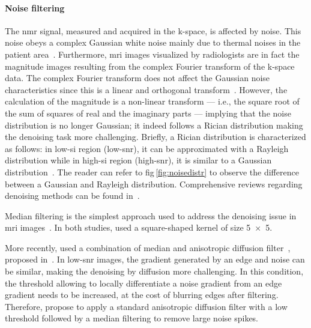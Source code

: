 \paragraph{Noise filtering} The \ac{nmr} signal, measured and acquired in the k-space, is affected by noise.
This noise obeys a complex Gaussian white noise mainly due to thermal noises in the patient area~\cite{Nowak1999}.
Furthermore, \ac{mri} images visualized by radiologists are in fact the magnitude images resulting from the complex Fourier transform of the k-space data.
The complex Fourier transform does not affect the Gaussian noise characteristics since this is a linear and orthogonal transform~\cite{Nowak1999}.
However, the calculation of the magnitude is a non-linear transform --- i.e., the square root of the sum of squares of real and the imaginary parts --- implying that the noise distribution is no longer Gaussian; it indeed follows a Rician distribution making the denoising task more challenging.
Briefly, a Rician distribution is characterized as follows: in low-\ac{si} region (low-\ac{snr}), it can be approximated with a Rayleigh distribution while in high-\ac{si} region (high-\ac{snr}), it is similar to a Gaussian distribution~\cite{Manjon2008}.
The reader can refer to \acs{fig}\,\ref{fig:noisedistr} to observe the difference between a Gaussian and Rayleigh distribution.
Comprehensive reviews regarding denoising methods can be found in~\cite{Buades2005,Mohan2014}.

Median filtering is the simplest approach used to address the denoising issue in \ac{mri} images~\cite{Ozer2009,Ozer2010}.
In both studies, \citeauthor{Ozer2010} used a square-shaped kernel of size \SI[product-units=repeat]{5x5}{\px}.%

More recently, \citeauthor{rampun2016quantitative} used a combination of median and anisotropic diffusion filter~\cite{rampun2015classifying,rampun2016computer,rampun2016computerb,rampun2016quantitative}, proposed in~\cite{ling2002smoothing}.
In low-\ac{snr} images, the gradient generated by an edge and noise can be similar, making the denoising by diffusion more challenging.
In this condition, the threshold allowing to locally differentiate a noise gradient from an edge gradient needs to be increased, at the cost of blurring edges after filtering.
Therefore, \citeauthor{ling2002smoothing} propose to apply a standard anisotropic diffusion filter with a low threshold followed by a median filtering to remove large noise spikes.

